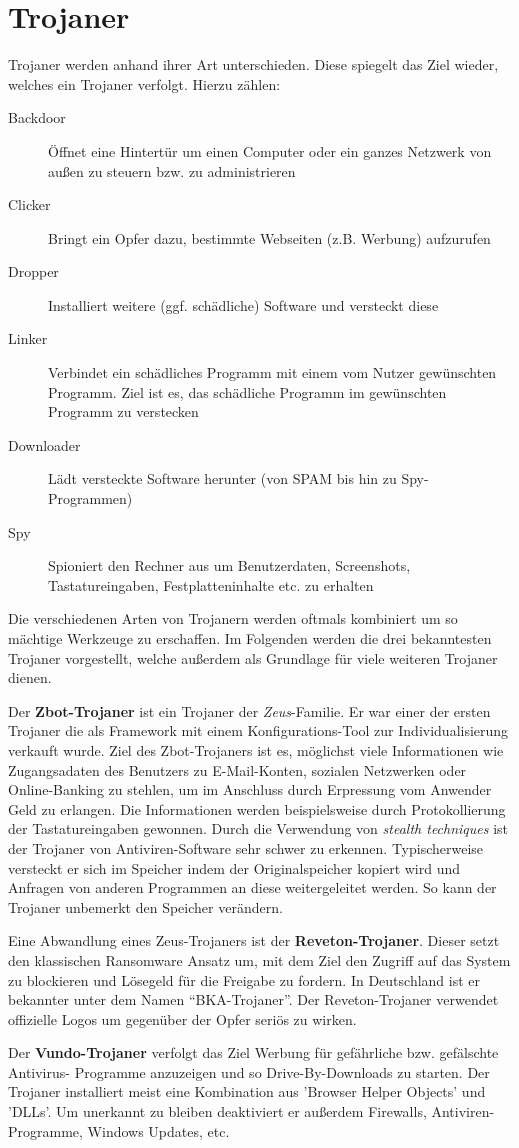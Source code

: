 \section{Trojaner}\label{sec:trojaner}
Trojaner werden anhand ihrer Art unterschieden.
Diese spiegelt das Ziel wieder, welches ein Trojaner verfolgt.
Hierzu zählen:
\begin{description}
    \item[Backdoor] Öffnet eine Hintertür um einen Computer oder ein ganzes Netzwerk von außen zu steuern bzw. zu administrieren
    \item[Clicker] Bringt ein Opfer dazu, bestimmte Webseiten (z.B. Werbung) aufzurufen 
    \item[Dropper] Installiert weitere (ggf. schädliche) Software und versteckt diese
    \item[Linker] Verbindet ein schädliches Programm mit einem vom Nutzer gewünschten Programm. Ziel ist es, das schädliche Programm im gewünschten Programm zu verstecken
    \item[Downloader] Lädt versteckte Software herunter (von SPAM bis hin zu Spy-Programmen)
    \item[Spy] Spioniert den Rechner aus um Benutzerdaten, Screenshots, Tastatureingaben, Festplatteninhalte etc. zu erhalten
\end{description}
Die verschiedenen Arten von Trojanern werden oftmals kombiniert um so mächtige Werkzeuge zu erschaffen. 
Im Folgenden werden die drei bekanntesten Trojaner vorgestellt, welche außerdem als Grundlage für viele weiteren Trojaner dienen. 

Der \textbf{Zbot-Trojaner} ist ein Trojaner der \textit{Zeus}-Familie. Er war einer der ersten
Trojaner die als Framework mit einem Konfigurations-Tool zur Individualisierung verkauft wurde.
Ziel des Zbot-Trojaners ist es, möglichst viele Informationen wie Zugangsadaten des Benutzers zu E-Mail-Konten, sozialen Netzwerken oder Online-Banking zu stehlen,
um im Anschluss durch Erpressung vom Anwender Geld zu erlangen.
Die Informationen werden beispielsweise durch Protokollierung der Tastatureingaben gewonnen. 
Durch die Verwendung von \textit{stealth techniques} ist der Trojaner von Antiviren-Software sehr schwer zu erkennen.
Typischerweise versteckt er sich im Speicher indem der Originalspeicher kopiert wird und Anfragen von anderen Programmen
an diese weitergeleitet werden.
So kann der Trojaner unbemerkt den Speicher verändern.

Eine Abwandlung eines Zeus-Trojaners ist der \textbf{Reveton-Trojaner}.
Dieser setzt den klassischen Ransomware Ansatz um, mit dem Ziel den Zugriff auf das System zu blockieren und Lösegeld für die Freigabe zu fordern.
In Deutschland ist er bekannter unter dem Namen \enquote{BKA-Trojaner}.
Der Reveton-Trojaner verwendet offizielle Logos um gegenüber der Opfer seriös zu wirken.

Der \textbf{Vundo-Trojaner} verfolgt das Ziel Werbung für gefährliche bzw. gefälschte Antivirus-
Programme anzuzeigen und so Drive-By-Downloads zu starten. Der Trojaner installiert
meist eine Kombination aus 'Browser Helper Objects' und 'DLLs'. Um unerkannt zu bleiben
deaktiviert er außerdem Firewalls, Antiviren-Programme, Windows Updates, etc. 
\cite{BEKTRO}